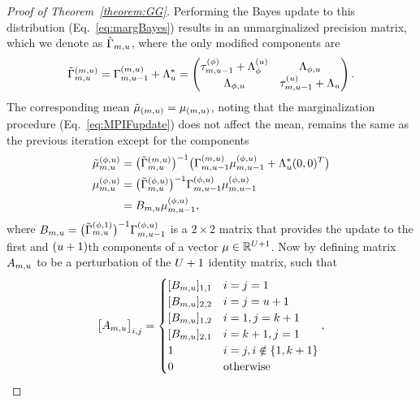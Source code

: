 \begin{proof}[Proof of Theorem~\ref{theorem:GG}]
Performing the Bayes update to this distribution (Eq.~\ref{eq:margBayes}) results in an unmarginalized precision matrix, which we denote as $\tilde{\Gamma}_{m, u}$, where the only modified components are
$$
\tilde{\Gamma}^{(m, u)}_{m, u} = \Gamma^{(m, u)}_{m, u-1} + \Lambda_u^* = \begin{pmatrix}
  \tau^{(\phi)}_{m, u-1} + \Lambda^{(u)}_{\phi} & \Lambda_{\phi, u} \\ 
  \Lambda_{\phi, u} & \tau^{(u)}_{m, u-1} + \Lambda_{u}
\end{pmatrix}. 
$$
The corresponding mean $\tilde{\mu}_{(m, u)} = \mu_{(m, u)}$, noting that the marginalization procedure (Eq.~\ref{eq:MPIFupdate}) does not affect the mean, remains the same as the previous iteration except for the components
\begin{align}
\begin{split}
    \tilde{\mu}^{(\phi, u)}_{m, u} &= \big(\tilde{\Gamma}^{(m, u)}_{m, u}\big)^{-1}\big(\Gamma^{(m, u)}_{m, u-1} \mu_{m, u-1}^{(\phi, u)} + \Lambda_u^* (0, 0)^T\big) \\
   \mu^{(\phi, u)}_{m, u} &= \big(\tilde{\Gamma}^{(\phi, u)}_{m, u}\big)^{-1}\Gamma^{(\phi, u)}_{m, u-1} \mu_{m, u-1}^{(\phi, u)} \\
   &= B_{m, u} \mu_{m, u-1}^{(\phi, u)}, 
\end{split}\label{eq:submatB}
\end{align}
where $B_{m, u} = \big(\tilde{\Gamma}^{(\phi, 1)}_{m, u}\big)^{-1}\Gamma^{(\phi, u)}_{m, u-1}$ is a $2\times 2$ matrix that provides the update to the first and $(u+1)$th components of a vector $\mu \in \mathbb{R}^{U+1}$.
Now by defining matrix $A_{m, u}$ to be a perturbation of the $U+1$ identity matrix, such that
\begin{equation*}
\big[A_{\nmif, \unit}\big]_{i, j} = \begin{cases}
  [B_{\nmif, \unit}]_{1, 1} & i = j = 1 \\
  [B_{\nmif, \unit}]_{2, 2} & i = j = u+1 \\
  [B_{\nmif, \unit}]_{1, 2} & i = 1, j = k+1 \\
  [B_{\nmif, \unit}]_{2, 1} & i = k+1, j = 1 \\
  1 & i = j, i \notin \{1, k+1\} \\
  0 & \text{otherwise}
\end{cases},

\end{equation*}
\end{proof}
